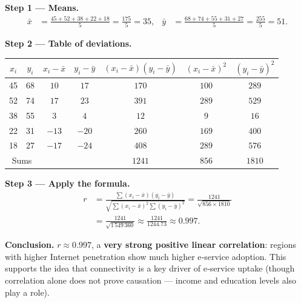 \documentclass[11pt]{article}
\begin{document}
\begin{corrige}
\textbf{Step 1 — Means.}
\begin{align*}
\bar{x} &= \frac{45+52+38+22+18}{5} = \frac{175}{5} = 35, &
\bar{y} &= \frac{68+74+55+31+27}{5} = \frac{255}{5} = 51.
\end{align*}

\textbf{Step 2 — Table of deviations.}
\begin{center}
\begin{tabular}{|c|c|c|c|c|c|c|}\hline
$x_i$ & $y_i$ & $x_i-\bar{x}$ & $y_i-\bar{y}$ & $(x_i-\bar{x})(y_i-\bar{y})$ & $(x_i-\bar{x})^2$ & $(y_i-\bar{y})^2$ \\ \hline
45 & 68 & $10$ & $17$ & $170$ & $100$ & $289$ \\ \hline
52 & 74 & $17$ & $23$ & $391$ & $289$ & $529$ \\ \hline
38 & 55 & $3$ & $4$ & $12$ & $9$ & $16$ \\ \hline
22 & 31 & $-13$ & $-20$ & $260$ & $169$ & $400$ \\ \hline
18 & 27 & $-17$ & $-24$ & $408$ & $289$ & $576$ \\ \hline
\multicolumn{2}{|c|}{Sums} & & & $1241$ & $856$ & $1810$ \\ \hline
\end{tabular}
\end{center}

\textbf{Step 3 — Apply the formula.}
\begin{align*}
r &= \frac{\sum (x_i-\bar{x})(y_i-\bar{y})}{\sqrt{\sum (x_i-\bar{x})^2 \sum (y_i-\bar{y})^2}}
= \frac{1241}{\sqrt{856 \times 1810}} \\
&= \frac{1241}{\sqrt{1\,549\,360}} \approx \frac{1241}{1244.73} \approx 0.997.
\end{align*}

\textbf{Conclusion.} $r \approx 0.997$, a \textbf{very strong positive linear correlation}: regions with higher Internet penetration show much higher e‑service adoption. This supports the idea that connectivity is a key driver of e‑service uptake (though correlation alone does not prove causation — income and education levels also play a role).
\end{corrige}
\end{document}
